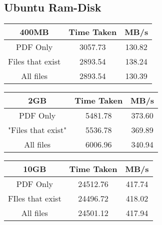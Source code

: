 \subsection{Ubuntu Ram-Disk}
\label{sec:aletheiaRamDisk}
{\centering
\begin{tabular}{ c | c | c }
400MB & Time Taken & MB/s \\
\hline
PDF Only & 3057.73 & 130.82 \\
Files that exist & 2893.54 & 138.24 \\
All files & 2893.54 & 130.39 \\
\end{tabular}
\label{tab:UbuntuTestingSumm400MBRAM}
\par}

{\centering
\begin{tabular}{ c | c | c }
2GB & Time Taken & MB/s \\
\hline
PDF Only & 5481.78 & 373.60 \\
"Files that exist" & 5536.78 & 369.89 \\
All files & 6006.96 & 340.94 \\
\end{tabular}
\label{tab:UbuntuTestingSumm2GBRAM}
\par}

{\centering
\begin{tabular}{ c | c | c }
10GB & Time Taken & MB/s \\
\hline
PDF Only & 24512.76 & 417.74 \\
FIles that exist & 24496.72 & 418.02 \\
All files & 24501.12 & 417.94 \\
\end{tabular}
\label{tab:UbuntuTestingSumm10GbRAM}
\par}